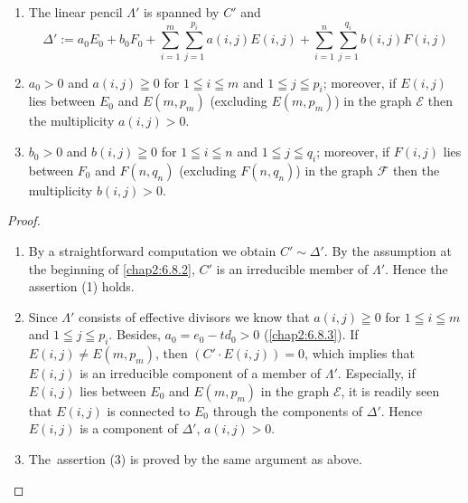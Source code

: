 \begin{lemma*}
\begin{enumerate}
\renewcommand{\labelenumi}{\rm(\theenumi)}
\item The linear pencil $\Lambda'$ is spanned by $C'$ and 
$$
\Delta':=a_{0}E_{0}+b_{0}F_{0}+\sum^{m}_{i=1}\sum^{p_{i}}_{j=1}a(i,j)E(i,j)+\sum^{n}_{i=1}\sum^{q_{i}}_{j=1}b(i,j)F(i,j) 
$$

\item $a_{0}>0$ and $a(i,j)\geqq 0$ for $1\leqq i\leqq m$ and $1\leqq
  j\leqq p_{i}$; moreover, if $E(i,j)$ lies between $E_{0}$ and
  $E(m,p_{m})$ (excluding $E(m,p_{m})$) in the graph $\mathscr{E}$
  then the multiplicity $a(i,j)>0$.

\item $b_{0}>0$ and $b(i,j)\geqq 0$ for $1\leqq i\leqq n$ and $1\leqq
  j\leqq q_{i}$; moreover, if $F(i,j)$ lies between $F_{0}$ and
  $F(n,q_{n})$ (excluding $F(n,q_{n})$) in the graph $\mathscr{F}$
  then the multiplicity $b(i,j)>0$.
\end{enumerate}
\end{lemma*}

\begin{proof}
\begin{enumerate}
\renewcommand{\labelenumi}{(\theenumi)}
\item By a straightforward computation we obtain $C'\sim \Delta'$. By
  the assumption at the beginning of \ref{chap2:6.8.2}, $C'$ is an
  irreducible member of $\Lambda'$. Hence the assertion (1) holds.

\item Since $\Lambda'$ consists of effective divisors we know that
  $a(i,j)\geqq 0$ for $1\leqq i\leqq m$ and $1\leqq j\leqq
  p_{i}$. Besides, $a_{0}=e_{0}-td_{0}>0$ (\cf \ref{chap2:6.8.3}). If
  $E(i,j)\neq E(m,p_{m})$, then $(C'\cdot E(i,j))=0$, which implies
  that $E(i,j)$ is an irreducible component of a member of
  $\Lambda'$. Especially, if $E(i,j)$ lies between $E_{0}$ and
  $E(m,p_{m})$ in the graph $\mathscr{E}$, it is readily seen that
  $E(i,j)$ is connected to $E_{0}$ through the components of
  $\Delta'$. Hence $E(i,j)$ is a component of $\Delta'$, \iec
  $a(i,j)>0$.

\item The\pageoriginale\ assertion (3) is proved by the same argument
  as above. 
\end{enumerate}
\end{proof}


